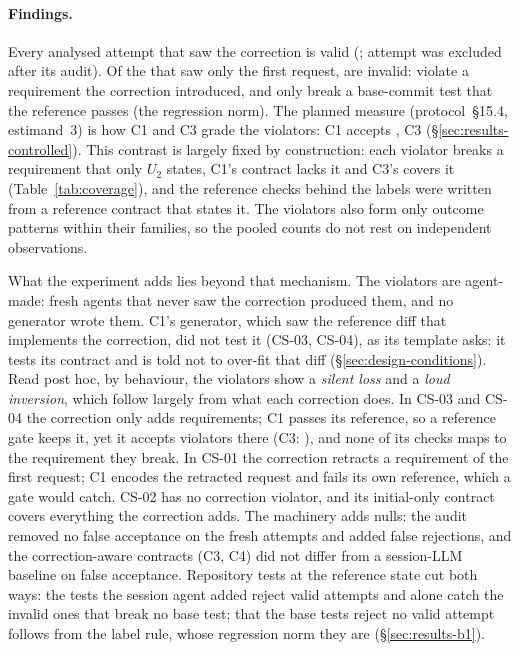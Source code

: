 \paragraph{Findings.} Every analysed attempt that saw the correction is valid (;  attempt was excluded after its audit). Of the  that saw only the first request,  are invalid:  violate a requirement the correction introduced, and  only break a base-commit test that the reference passes (the regression norm). The planned measure (protocol~\S15.4, estimand~3) is how C1 and C3 grade the violators: C1 accepts , C3  (\S\ref{sec:results-controlled}). This contrast is largely fixed by construction: each violator breaks a requirement that only $U_2$ states, C1's contract lacks it and C3's covers it (Table~\ref{tab:coverage}), and the reference checks behind the labels were written from a reference contract that states it. The  violators also form only  outcome patterns within their families, so the pooled counts do not rest on  independent observations.

What the experiment adds lies beyond that mechanism. The violators are agent-made: fresh agents that never saw the correction produced them, and no generator wrote them. C1's generator, which saw the reference diff that implements the correction, did not test it (CS-03, CS-04), as its template asks: it tests its contract and is told not to over-fit that diff (\S\ref{sec:design-conditions}). Read post hoc, by behaviour, the violators show a \emph{silent loss} and a \emph{loud inversion}, which follow largely from what each correction does. In CS-03 and CS-04 the correction only adds requirements; C1 passes its reference, so a reference gate keeps it, yet it accepts  violators there (C3: ), and none of its checks maps to the requirement they break. In CS-01 the correction retracts a requirement of the first request; C1 encodes the retracted request and fails its own reference, which a gate would catch. CS-02 has no correction violator, and its initial-only contract covers everything the correction adds. The machinery adds nulls: the audit removed no false acceptance on the fresh attempts and added false rejections, and the correction-aware contracts (C3, C4) did not differ from a session-LLM baseline on false acceptance. Repository tests at the reference state cut both ways: the tests the session agent added reject  valid attempts and alone catch the  invalid ones that break no base test; that the base tests reject no valid attempt follows from the label rule, whose regression norm they are (\S\ref{sec:results-b1}).

